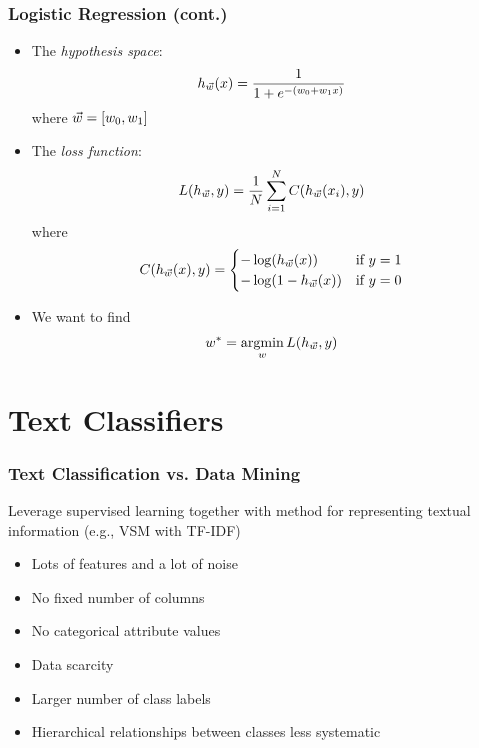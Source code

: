 \documentclass{beamer}
\DeclareMathOperator*{\argmin}{argmin}
\begin{document}
\begin{frame}
    \frametitle{Logistic Regression (cont.)}
    \begin{itemize}
    \item The \emph{hypothesis space}:
        \begin{displaymath}
            h_{\vec{w}}(x) = \frac{1}{1 + e^{-(w_0 + w_1x)}}
        \end{displaymath}
        where $\vec{w} = [w_0, w_1]$
    \item The \emph{loss function}:
        \begin{displaymath}
            L(h_{\vec{w}},y) = \frac{1}{N}\sum_{i=1}^NC(h_{\vec{w}}(x_i),y)
        \end{displaymath}
        where
        \begin{displaymath}
            C(h_{\vec{w}}(x),y) =
            \begin{cases}
                -\log(h_{\vec{w}}(x)) & \text{if $y=1$} \\
                -\log(1 - h_{\vec{w}}(x)) & \text{if $y=0$}
            \end{cases}
        \end{displaymath}
    \item We want to find
        \begin{displaymath}
            w^* = \argmin_w L(h_{\ww},y)
        \end{displaymath}
    \end{itemize}
\end{frame}



\section{Text Classifiers}


\begin{frame}
  \frametitle{Text Classification vs. Data Mining}
  \begin{block}{}
  Leverage supervised learning together with method for representing textual information (e.g., VSM with TF-IDF)
  \end{block}
  
  \begin{itemize}
  \item Lots of features and a lot of noise
  \item No fixed number of columns
  \item No categorical attribute values
  \item Data scarcity
  \item Larger number of class labels
  \item Hierarchical relationships between classes less systematic
  \end{itemize}

\end{frame}
\end{document}
